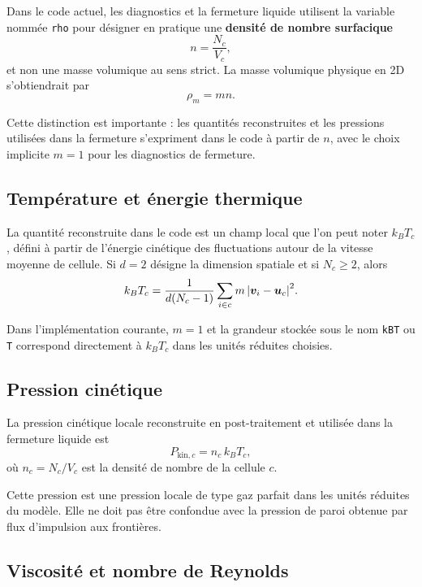 \documentclass[11pt,a4paper]{article}
\begin{document}
Dans le code actuel, les diagnostics et la fermeture liquide utilisent la variable nommée \verb|rho| pour désigner en pratique une \textbf{densité de nombre surfacique}
\begin{equation}
 n = \frac{N_c}{V_c},
\end{equation}
et non une masse volumique au sens strict. La masse volumique physique en 2D s'obtiendrait par
\begin{equation}
 \rho_m = m n.
\end{equation}

Cette distinction est importante : les quantités reconstruites et les pressions utilisées dans la fermeture s'expriment dans le code à partir de $n$, avec le choix implicite $m=1$ pour les diagnostics de fermeture.

\subsection{Température et énergie thermique}

La quantité reconstruite dans le code est un champ local que l'on peut noter $k_B T_c$, défini à partir de l'énergie cinétique des fluctuations autour de la vitesse moyenne de cellule. Si $d=2$ désigne la dimension spatiale et si $N_c\ge 2$, alors
\begin{equation}
 k_B T_c = \frac{1}{d(N_c-1)} \sum_{i\in c} m\,\abs{\bm{v}_i-\bm{u}_c}^2.
\end{equation}

Dans l'implémentation courante, $m=1$ et la grandeur stockée sous le nom \verb|kBT| ou \verb|T| correspond directement à $k_B T_c$ dans les unités réduites choisies.

\subsection{Pression cinétique}

La pression cinétique locale reconstruite en post-traitement et utilisée dans la fermeture liquide est
\begin{equation}
 P_{\mathrm{kin},c} = n_c\,k_B T_c,
\end{equation}
où $n_c=N_c/V_c$ est la densité de nombre de la cellule $c$.

Cette pression est une pression locale de type gaz parfait dans les unités réduites du modèle. Elle ne doit pas être confondue avec la pression de paroi obtenue par flux d'impulsion aux frontières.

\subsection{Viscosité et nombre de Reynolds}
\end{document}
